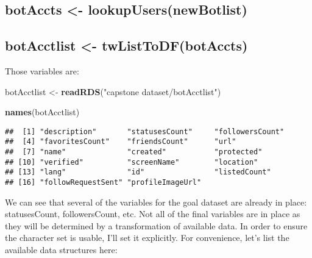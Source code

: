 \documentclass[]{article}
\newenvironment{Shaded}{\begin{snugshade}}{\end{snugshade}}
\newcommand{\KeywordTok}[1]{\textcolor[rgb]{0.13,0.29,0.53}{\textbf{#1}}}
\newcommand{\NormalTok}[1]{#1}
\newcommand{\OperatorTok}[1]{\textcolor[rgb]{0.81,0.36,0.00}{\textbf{#1}}}
\newcommand{\StringTok}[1]{\textcolor[rgb]{0.31,0.60,0.02}{#1}}
\begin{document}
\hypertarget{botaccts---lookupusersnewbotlist}{%
\subsection{botAccts \textless{}-
lookupUsers(newBotlist)}\label{botaccts---lookupusersnewbotlist}}

\hypertarget{botacctlist---twlisttodfbotaccts}{%
\subsection{botAcctlist \textless{}-
twListToDF(botAccts)}\label{botacctlist---twlisttodfbotaccts}}

Those variables are:

\begin{Shaded}
\begin{Highlighting}[]
\NormalTok{botAcctlist <-}\StringTok{ }\KeywordTok{readRDS}\NormalTok{(}\StringTok{"capstone dataset/botAcctlist"}\NormalTok{)}


\KeywordTok{names}\NormalTok{(botAcctlist) }
\end{Highlighting}
\end{Shaded}

\begin{verbatim}
##  [1] "description"       "statusesCount"     "followersCount"   
##  [4] "favoritesCount"    "friendsCount"      "url"              
##  [7] "name"              "created"           "protected"        
## [10] "verified"          "screenName"        "location"         
## [13] "lang"              "id"                "listedCount"      
## [16] "followRequestSent" "profileImageUrl"
\end{verbatim}

We can see that several of the variables for the goal dataset are
already in place: statusesCount, followersCount, etc. Not all of the
final variables are in place as they will be determined by a
transformation of available data. In order to ensure the character set
is usable, I'll set it explicitly. For convenience, let's list the
available data structures here:

\begin{Shaded}
\end{Shaded}
\end{document}
